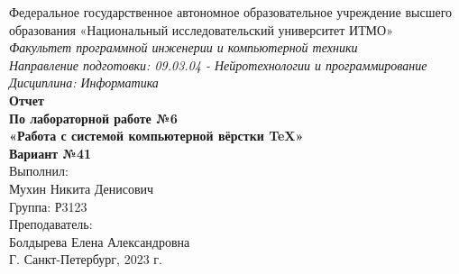 \documentclass{report}
\begin{document}
    \begin{titlepage}
        \begin{center}

            \fontsize{17}{20}\selectfont 
            Федеральное государственное автономное образовательное учреждение высшего образования «Национальный исследовательский университет ИТМО»\\[1.5cm]

            \textit{Факультет программной инженерии и компьютерной техники}\\

            \textit{Направление подготовки: 09.03.04 - Нейротехнологии и программирование}\\

            \textit{Дисциплина: Информатика}\\[1.5cm]

            \textbf{Отчет}\\
            \textbf{По лабораторной работе №6}\\
            \textbf{«Работа с системой компьютерной вёрстки TeX»}\\[0.5cm]

            \textbf{Вариант №41}\\[1cm]

            \raggedleft
            \fontsize{13}{20}\selectfont
            Выполнил:\\
            Мухин Никита Денисович\\[0.5cm]

            Группа: Р3123\\[0.5cm]

            Преподаватель:\\
            Болдырева Елена Александровна\\[1.2cm]

            \centering
            Г. Санкт-Петербург, 2023 г.

        \end{center}
    \end{titlepage}
\end{document}
